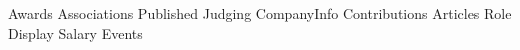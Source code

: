 \label{Exhibits}
\newcommand\ExhibitGroup{}
{Awards}
{Associations}
{Published}
{Judging}
{CompanyInfo}
{Contributions}
{Articles}
{Role}
{Display}
{Salary}
{Events}
